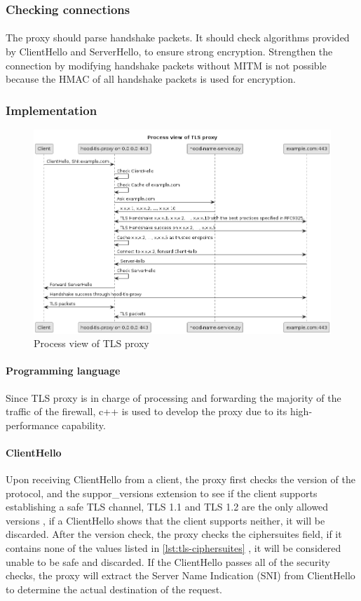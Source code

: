 \documentclass[mscthesis]{usiinfthesis}
\begin{document}
\subsubsection{Checking connections}
\paragraph{}
The proxy should parse handshake packets. It should check algorithms provided by ClientHello and ServerHello, to ensure strong encryption. Strengthen the connection by modifying handshake packets without MITM is not possible because the HMAC of all handshake packets is used for encryption.
\subsubsection{Implementation}

\begin{figure}[H]
  \includegraphics[width=\textwidth]{graphics/puml/process-tls-proxy.png}
  \caption{Process view of TLS proxy}
  \label{fig:tls-proxy-process-view}
\end{figure}

\paragraph{Programming language}
Since TLS proxy is in charge of processing and forwarding the majority of the traffic of the firewall, c++ is used to develop the proxy due to its high-performance capability.
\paragraph{ClientHello}
Upon receiving ClientHello from a client, the proxy first checks the version of the protocol, and the suppor\_versions extension to see if the client supports establishing a safe TLS channel, TLS 1.1 and TLS 1.2 are the only allowed versions \citep{rfc:bstprc}, if a ClientHello shows that the client supports neither, it will be discarded. After the version check, the proxy checks the ciphersuites field, if it contains none of the values listed in \ref{lst:tls-ciphersuites} \citep{rfc:bstprc}, it will be considered unable to be safe and discarded. If the ClientHello passes all of the security checks, the proxy will extract the Server Name Indication (SNI) from ClientHello to determine the actual destination of the request.
\end{document}
